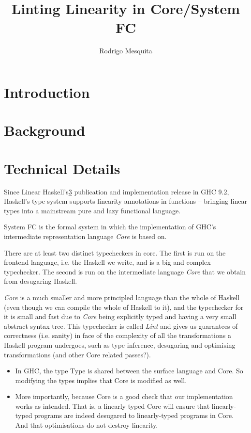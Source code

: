 \documentclass[a4paper, draft]{article}
\title{Linting Linearity in Core/System FC}
\author{Rodrigo Mesquita}
\begin{document}
\maketitle

\section{Introduction}

\section{Background}

\section{Technical Details}

Since Linear Haskell's\ref{}
publication and implementation release in GHC 9.2, Haskell's type system
supports linearity annotations in functions -- bringing linear types into a
mainstream pure and lazy functional language.

System FC is the formal system in which the implementation of GHC's intermediate
representation language \emph{Core} is based on.

There are at least two distinct typecheckers in core. The first is run on the frontend
language, i.e. the Haskell we write, and is a big and complex typechecker. The
second is run on the intermediate language \emph{Core} that we obtain from
desugaring Haskell.

\emph{Core} is a much smaller and more principled language than the whole of
Haskell (even though we can compile the whole of Haskell to it), and the
typechecker for it is small and fast due to \emph{Core} being explicitly typed
and having a very small abstract syntax tree. This typechecker is called
\emph{Lint} and gives us guarantees of correctness (i.e. sanity) in face of
the complexity of all the transformations a Haskell program undergoes, such as
type inference, desugaring and optimising transformations (and other Core
related passes?).

\begin{itemize}
    \item In GHC, the type Type is shared between the surface language and Core.
        So modifying the types implies that Core is modified as well. 

    \item More importantly, because Core is a good check that our implementation
        works as intended. That is, a linearly typed Core will ensure that
        linearly-typed programs are indeed desugared to linearly-typed programs
        in Core. And that optimisations do not destroy linearity.
\end{itemize}
\end{document}
